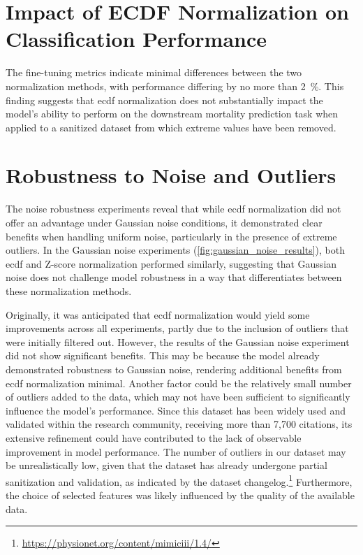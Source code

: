 \section{Impact of ECDF Normalization on Classification Performance}

The fine-tuning metrics indicate minimal differences between the two normalization methods, with performance differing by no more than \qty{2}{\percent}. This finding suggests that \gls{ecdf} normalization does not substantially impact the model's ability to perform on the downstream mortality prediction task when applied to a sanitized dataset from which extreme values have been removed.

\section{Robustness to Noise and Outliers}

The noise robustness experiments reveal that while \gls{ecdf} normalization did not offer an advantage under Gaussian noise conditions, it demonstrated clear benefits when handling uniform noise, particularly in the presence of extreme outliers. In the Gaussian noise experiments (\cref{fig:gaussian_noise_results}), both \gls{ecdf} and Z-score normalization performed similarly, suggesting that Gaussian noise does not challenge model robustness in a way that differentiates between these normalization methods.

Originally, it was anticipated that \gls{ecdf} normalization would yield some improvements across all experiments, partly due to the inclusion of outliers that were initially filtered out. However, the results of the Gaussian noise experiment did not show significant benefits. This may be because the model already demonstrated robustness to Gaussian noise, rendering additional benefits from \gls{ecdf} normalization minimal. Another factor could be the relatively small number of outliers added to the data, which may not have been sufficient to significantly influence the model's performance. Since this dataset has been widely used and validated within the research community, receiving more than 7,700 citations, its extensive refinement could have contributed to the lack of observable improvement in model performance. The number of outliers in our dataset may be unrealistically low, given that the dataset has already undergone partial sanitization and validation, as indicated by the dataset changelog.\footnote{\url{https://physionet.org/content/mimiciii/1.4/}} Furthermore, the choice of selected features was likely influenced by the quality of the available data.


